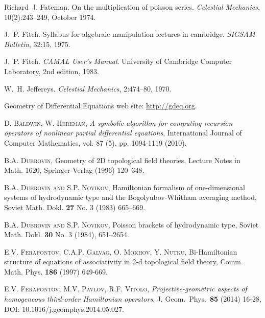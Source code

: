 \begin{thebibliography}{999}
Richard~J. Fateman.
\newblock On the multiplication of poisson series.
\newblock \emph{Celestial Mechanics}, 10(2):243--249, October 1974.

J.~P. Fitch.
\newblock Syllabus for algebraic manipulation lectures in cambridge.
\newblock \emph{SIGSAM Bulletin}, 32:15, 1975.

J.~P. Fitch.
\newblock \emph{{CAMAL} {User's} {Manual}}.
\newblock University of Cambridge Computer Laboratory, 2nd edition, 1983.

W.~H. Jeffereys.
\newblock \emph{Celestial Mechanics}, 2:474--80, 1970.


 Geometry of Differential Equations web site:
  \url{http://gdeq.org}.


 \textsc{D. Baldwin, W. Hereman}, \emph{A symbolic algorithm
    for computing recursion operators of nonlinear partial differential
    equations}, International Journal of Computer Mathematics, vol. 87 (5),
  pp. 1094-1119 (2010).

 \textsc{B.A. Dubrovin}, \newblock Geometry of 2D topological
field theories, Lecture Notes in Math. 1620, Springer-Verlag (1996) 120--348.

 \textsc{B.A. Dubrovin and S.P. Novikov}, \newblock Hamiltonian
  formalism of one-dimensional systems of hydrodynamic type and the
  Bogolyubov-Whitham averaging method, Soviet Math. Dokl. \textbf{27} No. 3
  (1983) 665--669.

 \textsc{B.A. Dubrovin and S.P. Novikov}, Poisson brackets of
  hydrodynamic type, Soviet Math. Dokl. \textbf{30} No. 3 (1984), 651--2654.

 \textsc{E.V. Ferapontov, C.A.P. Galvao, O. Mokhov, Y. Nutku},
  Bi-Hamiltonian structure of equations of associativity in 2-d
  topological field theory, Comm. Math. Phys. \textbf{186 }(1997) 649-669.

 \textsc{E.V. Ferapontov, M.V. Pavlov, R.F. Vitolo},
\emph{Projective-geometric aspects of homogeneous third-order Hamiltonian
operators}, J. Geom.\ Phys.\ \textbf{85} (2014) 16-28, DOI:
10.1016/j.geomphys.2014.05.027.


\end{thebibliography}
